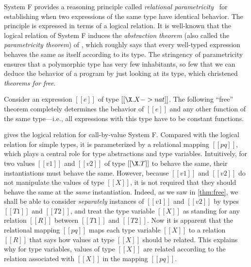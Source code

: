System F provides a reasoning principle called \emph{relational
  parametricity}~\citep{reynolds1983types} for establishing when two expressions
of the same type have identical behavior. The principle is expressed in terms of
a logical relation. It is well-known that the logical relation of System F
induces the \emph{abstraction theorem} (also called the \emph{parametricity
  theorem}) of \citet{reynolds1983types}, which roughly says that every
well-typed expression behaves the same as itself according to its type. The
stringency of parametricity ensures that a polymorphic type has very few
inhabitants, so few that we can deduce the behavior of a program by just looking
at its type, which \citet{wadler1989theorems} christened \emph{theorems for free}.

Consider an expression $[[e]]$ of type $[[ \X . X -> nat ]]$. The following
``free'' theorem completely determines the behavior of $[[e]]$ and any other
function of the same type---i.e., all expressions with this type have to be constant
functions.



 gives the logical relation for call-by-value System F.
Compared with the logical relation for simple types, it is parameterized by a
relational mapping $[[pq]]$, which plays a central role for type abstractions
and type variables. Intuitively, for two values $[[v1]]$ and $[[v2]]$ of type
$[[\X . T]]$ to behave the same, their instantiations must behave the same.
However, because $[[v1]]$ and $[[v2]]$ do not manipulate the values of type
$[[X]]$, it is not required that they should behave the same at the
\emph{same} instantiation. Indeed, as we saw in \cref{thm:free}, we shall be
able to consider \emph{separately} instances of $[[v1]]$ and $[[v2]]$ by types
$[[T1]]$ and $[[T2]]$, and treat the type variable $[[X]]$ as standing for any
relation $[[R]]$ between $[[T1]]$ and $[[T2]]$. Now it is apparent that the
relational mapping $[[pq]]$ maps each type variable $[[X]]$ to a relation
$[[R]]$ that says how values at type $[[X]]$ should be related. This explains
why for type variables, values of type $[[X]]$ are related according to the
relation associated with $[[X]]$ in the mapping $[[pq]]$.




